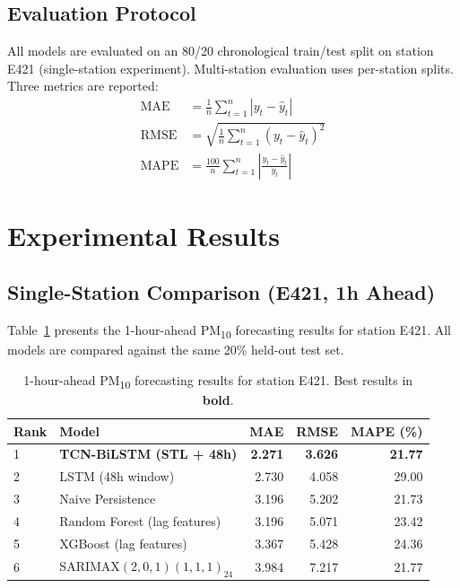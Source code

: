 \documentclass[runningheads]{llncs}
\begin{document}
\subsection{Evaluation Protocol}
All models are evaluated on an 80/20 chronological train/test split
on station E421 (single-station experiment). Multi-station evaluation
uses per-station splits. Three metrics are reported:
\begin{align}
  \text{MAE}  &= \frac{1}{n}\sum_{t=1}^{n}|y_t - \hat{y}_t| \label{eq:mae}\\
  \text{RMSE} &= \sqrt{\frac{1}{n}\sum_{t=1}^{n}(y_t - \hat{y}_t)^2} \label{eq:rmse}\\
  \text{MAPE} &= \frac{100}{n}\sum_{t=1}^{n}\left|\frac{y_t - \hat{y}_t}{y_t}\right| \label{eq:mape}
\end{align}

\section{Experimental Results}

\subsection{Single-Station Comparison (E421, 1h Ahead)}
Table~\ref{tab:results} presents the 1-hour-ahead PM\textsubscript{10}
forecasting results for station E421. All models are compared against
the same 20\% held-out test set.

\begin{table}[t]
\caption{1-hour-ahead PM\textsubscript{10} forecasting results for
station E421. Best results in \textbf{bold}.}\label{tab:results}
\centering
\begin{tabular}{llrrr}
\toprule
Rank & Model & MAE & RMSE & MAPE (\%)\\
\midrule
1 & \textbf{TCN-BiLSTM (STL + 48h)} & \textbf{2.271} & \textbf{3.626} & \textbf{21.77}\\
2 & LSTM (48h window)               & 2.730 & 4.058 & 29.00\\
3 & Naive Persistence               & 3.196 & 5.202 & 21.73\\
4 & Random Forest (lag features)    & 3.196 & 5.071 & 23.42\\
5 & XGBoost (lag features)          & 3.367 & 5.428 & 24.36\\
6 & SARIMAX$(2,0,1)(1,1,1)_{24}$   & 3.984 & 7.217 & 21.77\\
\bottomrule
\end{tabular}
\end{table}
\end{document}
